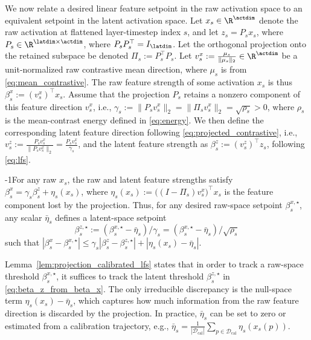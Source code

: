 \documentclass{article}
\begin{document}
We now relate a desired linear feature setpoint in the raw activation
space to an equivalent setpoint in the latent activation space.
Let $x_s\in\R^{\actdim}$ denote the raw activation at flattened
layer-timestep index $s$, and let
$z_s = P_s x_s$, where $P_s\in\R^{\latdim\times \actdim}$,
where $P_sP_s^\top=I_{\latdim}$. Let the orthogonal projection
onto the retained subspace be denoted $\Pi_s := P_s^\top P_s$.
Let $v^x_s := \frac{\mu_s}{\Vert \mu_s \Vert_2}\in\R^{\actdim}$ be a unit-normalized raw contrastive mean direction, where
$\mu_s$ is from \eqref{eq:mean_contrastive}. The raw feature strength of some activation $x_s$ is thus
$\beta^x_s := (v^x_s)^\top x_s$. 
Assume that the projection $P_s$ retains a nonzero component of this
feature direction $v^x_s$, i.e., $\gamma_s := \|P_s v^x_s\|_2 = \|\Pi_s v^x_s\|_2 = \sqrt{\rho_s} >0$, where $\rho_s$ is  the mean-contrast energy defined in \eqref{eq:energy}.
We then define the corresponding latent feature direction following \eqref{eq:projected_contrastive}, i.e.,
    $v^z_s := \frac{P_s v^x_s}{\|P_s v^x_s\|_2}
    =
    \frac{P_s v^x_s}{\gamma_s}$,
and the latent feature strength as $\beta^z_s := (v^z_s)^\top z_s$, following \eqref{eq:lfs}.

\begin{lemma}
\label{lem:projection_calibrated_lfs}
\looseness-1For any raw $x_s$, the raw and latent feature strengths
satisfy $\beta^x_s = \gamma_s \beta^z_s + \eta_s(x_s)$, 
where $\eta_s(x_s) := \bigl((I-\Pi_s)v^x_s\bigr)^\top x_s$
is the feature component lost by the projection. Thus, for
any desired raw-space setpoint $\beta^{x,\star}_s$, any scalar
$\bar\eta_s$ defines a latent-space setpoint
\begin{equation}
    \beta^{z,\star}_s
    :=
    (\beta^{x,\star}_s-\bar\eta_s)/\gamma_s = (\beta^{x,\star}_s-\bar\eta_s)/\sqrt{\rho_s}
    \label{eq:beta_z_from_beta_x}
\end{equation}
such that $\left|
    \beta^x_s-\beta^{x,\star}_s
    \right|
    \le
    \gamma_s
    \left|
    \beta^z_s-\beta^{z,\star}_s
    \right|
    +
    \left|
    \eta_s(x_s)-\bar\eta_s
    \right|$.
\end{lemma}


Lemma~\ref{lem:projection_calibrated_lfs} states that in order to track a raw-space threshold
$\beta^{x,\star}_s$, it suffices to track the latent threshold
$\beta^{z,\star}_s$ in \eqref{eq:beta_z_from_beta_x}. The only
irreducible discrepancy is the null-space term
$\eta_s(x_s)-\bar\eta_s$, which captures how much information from the raw
feature direction is discarded by the projection. In practice,
$\bar\eta_s$ can be set to zero or estimated from a calibration
trajectory, e.g.,
    $\bar\eta_s
    =
    \frac{1}{|\mathcal{D}_{\mathrm{cal}}|}
    \sum_{p\in\mathcal{D}_{\mathrm{cal}}}
    \eta_s(x_s(p))$.
\end{document}
